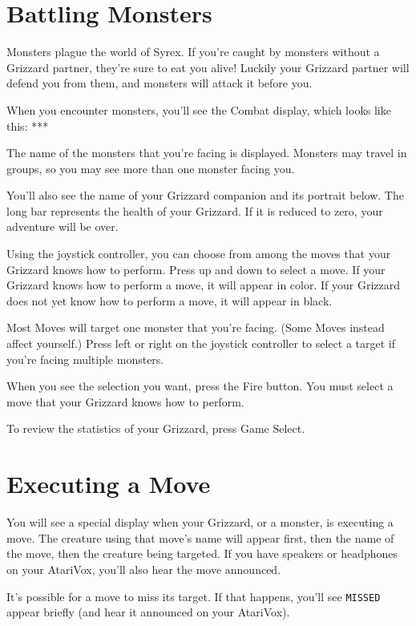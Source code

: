\documentclass[12pt,openright,book]{memoir}
\begin{document}
\section{Battling Monsters}

Monsters plague the world of Syrex. If you're caught by monsters without
a Grizzard partner, they're sure to eat you alive! Luckily your Grizzard
partner  will  defend  you  from  them,  and  monsters  will  attack  it
before you.

When you encounter monsters, you'll  see the Combat display, which looks
like this: ***

The name of  the monsters that you're facing is  displayed. Monsters may
travel in groups, so you may see more than one monster facing you.

You'll also  see the name  of your  Grizzard companion and  its portrait
below. The  long bar represents  the health of  your Grizzard. If  it is
reduced to zero, your adventure will be over.

Using the joystick controller, you can  choose from among the moves that
your Grizzard knows how to perform. Press  up and down to select a move.
If your Grizzard knows  how to perform a move, it  will appear in color.
If your Grizzard does not yet know how to perform a move, it will appear
in black.

Most  Moves will  target one  monster  that you're  facing. (Some  Moves
instead affect yourself.) Press left or right on the joystick controller
to select a target if you're facing multiple monsters.

When you  see the selection  you want, press  the Fire button.  You must
select a move that your Grizzard knows how to perform.

To review the statistics of your Grizzard, press Game Select.

\section{Executing a Move}

You will  see a  special display  when your Grizzard,  or a  monster, is
executing a move. The creature using that move's name will appear first,
then the name of the move, then the creature being targeted. If you have
speakers  or  headphones   on  your  AtariVox,  you'll   also  hear  the
move announced.

It's possible for a move to miss its target. If that happens, you'll see
\texttt{MISSED} appear briefly (and hear it announced on your AtariVox).
\end{document}
